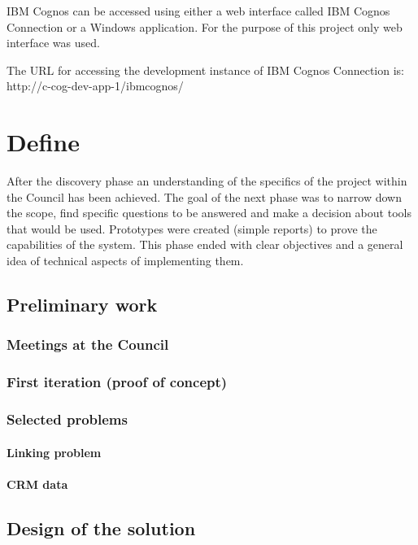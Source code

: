 IBM Cognos can be accessed using either a web interface called IBM Cognos Connection or a Windows application. For the purpose of this project only web interface was used.

The URL for accessing the development instance of IBM Cognos Connection is:\\
http://c-cog-dev-app-1/ibmcognos/

	\section{Define}
	
After the discovery phase an understanding of the specifics of the project within the Council has been achieved. The goal of the next phase was to narrow down the scope, find specific questions to be answered and make a decision about tools that would be used. Prototypes were created (simple reports) to prove the capabilities of the system. This phase ended with clear objectives and a general idea of technical aspects of implementing them.	
	
		\subsection{Preliminary work}
		
			\subsubsection{Meetings at the Council}
			
			\subsubsection{First iteration (proof of concept)}
			
			\subsubsection{Selected problems}
			
				\paragraph{Linking problem}
				
				\paragraph{CRM data}
				
		\subsection{Design of the solution}
		
